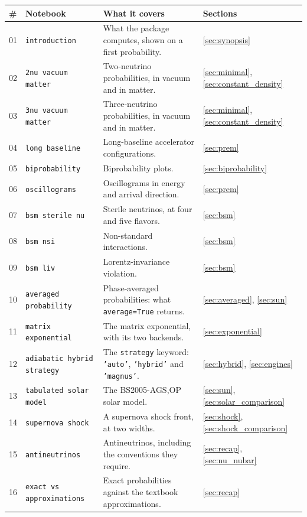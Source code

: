 \documentclass[final,5p,times,twocolumn,sort,compress]{elsarticle}
\makeatletter
\DeclareRobustCommand{\_}{%
  \ifmmode\nfss@text{\textunderscore}\else\textunderscore\allowbreak\fi}
\makeatother
\begin{document}
{\def\arraystretch{1.15}
\begin{table}[t!]
{\small
\begin{tabular}{@{}p{0.6cm}p{4.3cm}p{9.2cm}p{2.9cm}@{}}
 \# & Notebook & What it covers & Sections \\
 \hline
 01 & {\tt introduction} & What the package computes, shown on a first probability. & \ref{sec:synopsis} \\
 02 & {\tt 2nu\_vacuum\_matter} & Two-neutrino probabilities, in vacuum and in matter. & \ref{sec:minimal}, \ref{sec:constant_density} \\
 03 & {\tt 3nu\_vacuum\_matter} & Three-neutrino probabilities, in vacuum and in matter. & \ref{sec:minimal}, \ref{sec:constant_density} \\
 04 & {\tt long\_baseline} & Long-baseline accelerator configurations. & \ref{sec:prem} \\
 05 & {\tt biprobability} & Biprobability plots. & \ref{sec:biprobability} \\
 06 & {\tt oscillograms} & Oscillograms in energy and arrival direction. & \ref{sec:prem} \\
 07 & {\tt bsm\_sterile\_nu} & Sterile neutrinos, at four and five flavors. & \ref{sec:bsm} \\
 08 & {\tt bsm\_nsi} & Non-standard interactions. & \ref{sec:bsm} \\
 09 & {\tt bsm\_liv} & Lorentz-invariance violation. & \ref{sec:bsm} \\
 10 & {\tt averaged\_probability} & Phase-averaged probabilities: what {\tt average=True} returns. & \ref{sec:averaged}, \ref{sec:sun} \\
 11 & {\tt matrix\_exponential} & The matrix exponential, with its two backends. & \ref{sec:exponential} \\
 12 & {\tt adiabatic\_hybrid\_strategy} & The {\tt strategy} keyword: {\tt 'auto'}, {\tt 'hybrid'} and {\tt 'magnus'}. & \ref{sec:hybrid}, \ref{sec:engines} \\
 13 & {\tt tabulated\_solar\_model} & The BS2005-AGS,OP solar model. & \ref{sec:sun}, \ref{sec:solar_comparison} \\
 14 & {\tt supernova\_shock} & A supernova shock front, at two widths. & \ref{sec:shock}, \ref{sec:shock_comparison} \\
 15 & {\tt antineutrinos} & Antineutrinos, including the conventions they require. & \ref{sec:recap}, \ref{sec:nu_nubar} \\
 16 & {\tt exact\_vs\_approximations} & Exact probabilities against the textbook approximations. & \ref{sec:recap} \\

\end{tabular}}
\end{table}}
\end{document}
